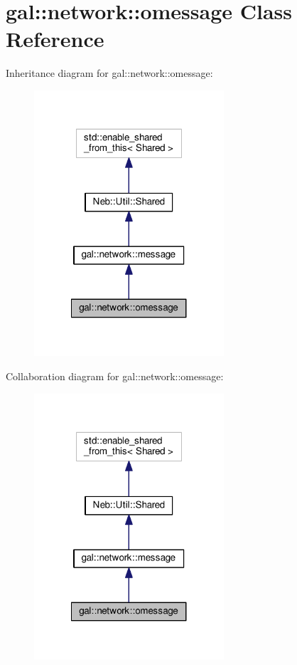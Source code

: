 \hypertarget{classgal_1_1network_1_1omessage}{\section{gal\-:\-:network\-:\-:omessage Class Reference}
\label{classgal_1_1network_1_1omessage}
}


Inheritance diagram for gal\-:\-:network\-:\-:omessage\-:
\nopagebreak
\begin{figure}[H]
\begin{center}
\leavevmode
\includegraphics[width=200pt]{classgal_1_1network_1_1omessage__inherit__graph}
\end{center}
\end{figure}


Collaboration diagram for gal\-:\-:network\-:\-:omessage\-:
\nopagebreak
\begin{figure}[H]
\begin{center}
\leavevmode
\includegraphics[width=200pt]{classgal_1_1network_1_1omessage__coll__graph}
\end{center}
\end{figure}
